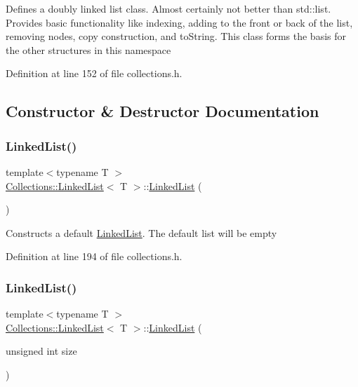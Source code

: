 Defines a doubly linked list class. Almost certainly not better than std\+::list. Provides basic functionality like indexing, adding to the front or back of the list, removing nodes, copy construction, and to\+String. This class forms the basis for the other structures in this namespace 

Definition at line 152 of file collections.\+h.



\subsection{Constructor \& Destructor Documentation}
\hypertarget{class_collections_1_1_linked_list_a547dc3612e33d645182861b562422026}{}\label{class_collections_1_1_linked_list_a547dc3612e33d645182861b562422026} 
\subsubsection{\texorpdfstring{Linked\+List()}{LinkedList()}\hspace{0.1cm}{\footnotesize\ttfamily [1/6]}}
{\footnotesize\ttfamily template$<$typename T $>$ \\
\hyperlink{class_collections_1_1_linked_list}{Collections\+::\+Linked\+List}$<$ T $>$\+::\hyperlink{class_collections_1_1_linked_list}{Linked\+List} (\begin{DoxyParamCaption}{ }\end{DoxyParamCaption})}

Constructs a default \hyperlink{class_collections_1_1_linked_list}{Linked\+List}. The default list will be empty 

Definition at line 194 of file collections.\+h.

\hypertarget{class_collections_1_1_linked_list_a30fd67a48642d3765239c2ecdc8427cb}{}\label{class_collections_1_1_linked_list_a30fd67a48642d3765239c2ecdc8427cb} 
\subsubsection{\texorpdfstring{Linked\+List()}{LinkedList()}\hspace{0.1cm}{\footnotesize\ttfamily [2/6]}}
{\footnotesize\ttfamily template$<$typename T $>$ \\
\hyperlink{class_collections_1_1_linked_list}{Collections\+::\+Linked\+List}$<$ T $>$\+::\hyperlink{class_collections_1_1_linked_list}{Linked\+List} (\begin{DoxyParamCaption}\item[{unsigned int}]{size }\end{DoxyParamCaption})}

